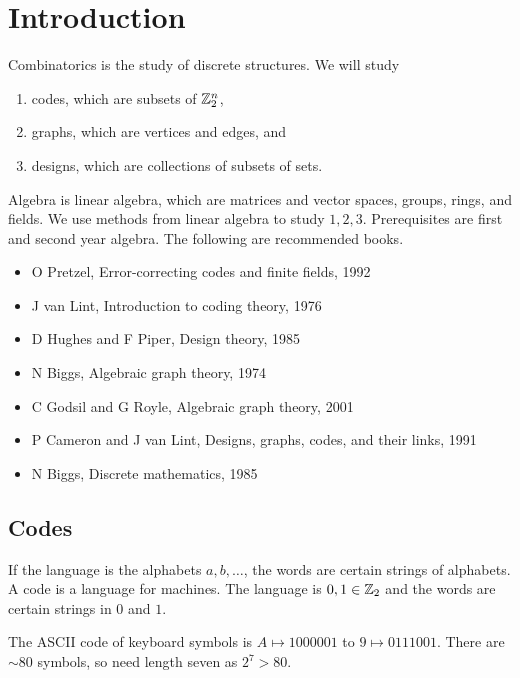 





\section{Introduction}


Combinatorics is the study of discrete structures. We will study
\begin{enumerate}
\item codes, which are subsets of $ \mathbb{Z}_2^n $,
\item graphs, which are vertices and edges, and
\item designs, which are collections of subsets of sets.
\end{enumerate}
Algebra is linear algebra, which are matrices and vector spaces, groups, rings, and fields. We use methods from linear algebra to study $ 1, 2, 3 $. Prerequisites are first and second year algebra. The following are recommended books.
\begin{itemize}
\item O Pretzel, Error-correcting codes and finite fields, 1992
\item J van Lint, Introduction to coding theory, 1976
\item D Hughes and F Piper, Design theory, 1985
\item N Biggs, Algebraic graph theory, 1974
\item C Godsil and G Royle, Algebraic graph theory, 2001
\item P Cameron and J van Lint, Designs, graphs, codes, and their links, 1991
\item N Biggs, Discrete mathematics, 1985
\end{itemize}

\subsection{Codes}

If the language is the alphabets $ a, b, \dots $, the words are certain strings of alphabets. A code is a language for machines. The language is $ 0, 1 \in \mathbb{Z}_2 $ and the words are certain strings in $ 0 $ and $ 1 $.

\begin{example*}
The ASCII code of keyboard symbols is $ A \mapsto 1000001 $ to $ 9 \mapsto 0111001 $. There are $ \sim80 $ symbols, so need length seven as $ 2^7 > 80 $.
\end{example*}

